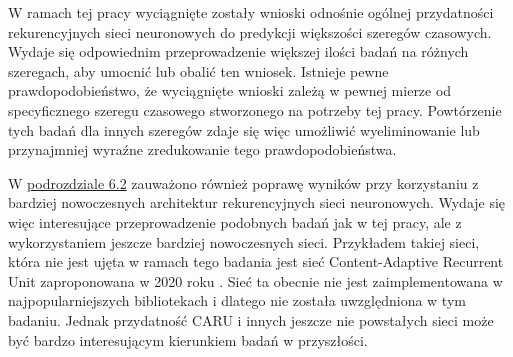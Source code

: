 \documentclass[10pt,a4paper]{article}
\begin{document}
W ramach tej pracy wyciągnięte zostały wnioski odnośnie ogólnej przydatności rekurencyjnych sieci neuronowych do predykcji większości szeregów czasowych. Wydaje się odpowiednim przeprowadzenie większej ilości badań na różnych szeregach, aby umocnić lub obalić ten wniosek. Istnieje pewne prawdopodobieństwo, że wyciągnięte wnioski zależą w pewnej mierze od specyficznego szeregu czasowego stworzonego na potrzeby tej pracy. Powtórzenie tych badań dla innych szeregów zdaje się więc umożliwić wyeliminowanie lub przynajmniej wyraźne zredukowanie tego prawdopodobieństwa. 

W \hyperlink{subsection.6.2}{podrozdziale 6.2} zauważono również poprawę wyników przy korzystaniu z bardziej nowoczesnych architektur rekurencyjnych sieci neuronowych. Wydaje się więc interesujące przeprowadzenie podobnych badań jak w tej pracy, ale z wykorzystaniem jeszcze bardziej nowoczesnych sieci. Przykładem takiej sieci, która nie jest ujęta w ramach tego badania jest sieć Content-Adaptive Recurrent Unit zaproponowana w 2020 roku \cite{chan2020caru}. Sieć ta obecnie nie jest zaimplementowana w najpopularniejszych bibliotekach i dlatego nie została uwzględniona w tym badaniu. Jednak przydatność CARU i innych jeszcze nie powstałych sieci może być bardzo interesującym kierunkiem badań w przyszłości. 

\newpage
\printbibliography[title=Bibliografia]
\end{document}
